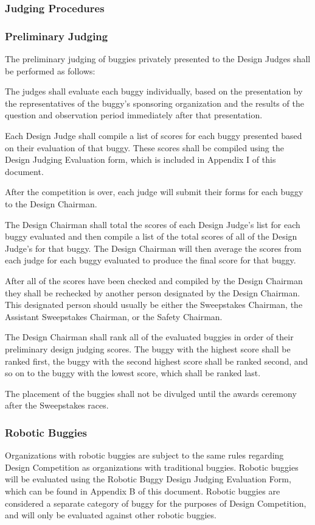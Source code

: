 \subsubsection*{Judging Procedures}

\subsubsection*{Preliminary Judging}

	The preliminary judging of buggies privately presented to the Design Judges shall be performed as follows:
	\newline

	The judges shall evaluate each buggy individually, based on the presentation by the representatives of the buggy's sponsoring organization and the results of the question and observation period immediately after that presentation.

	Each Design Judge shall compile a list of scores for each buggy presented based on their evaluation of that buggy. These scores shall be compiled using the Design Judging Evaluation form, which is included in Appendix I of this document.

	After the competition is over, each judge will submit their forms for each buggy to the Design Chairman.

	The Design Chairman shall total the scores of each Design Judge's list for each buggy evaluated and then compile a list of the total scores of all of the Design Judge's for that buggy. The Design Chairman will then average the scores from each judge for each buggy evaluated to produce the final score for that buggy.
	
	After all of the scores have been checked and compiled by the Design Chairman they shall be rechecked by another person designated by the Design Chairman. This designated person should usually be either the Sweepstakes Chairman, the Assistant Sweepstakes Chairman, or the Safety Chairman.

	The Design Chairman shall rank all of the evaluated buggies in order of their preliminary design judging scores. The buggy with the highest score shall be ranked first, the buggy with the second highest score shall be ranked second, and so on to the buggy with the lowest score, which shall be ranked last. 

    The placement of the buggies shall not be divulged until the awards ceremony after the Sweepstakes races.

\subsubsection*{Robotic Buggies}

    Organizations with robotic buggies are subject to the same rules regarding Design Competition as organizations with traditional buggies. Robotic buggies will be evaluated using the Robotic Buggy Design Judging Evaluation Form, which can be found in Appendix B of this document. Robotic buggies are considered a separate category of buggy for the purposes of Design Competition, and will only be evaluated against other robotic buggies. 


